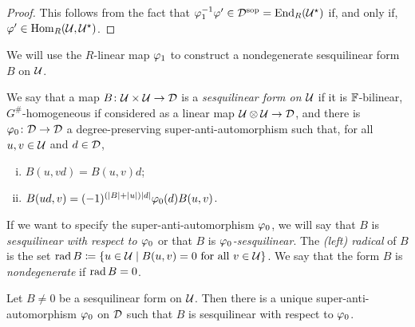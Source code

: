 \begin{proof}
    This follows from the fact that $ \varphi_1^{-1} \varphi' \in  \mathcal{D}^{\mathrm{sop}} = \operatorname{End}_R(\mathcal U^\star)$ if, and only if, $\varphi' \in \operatorname{Hom}_R(\mathcal U, \mathcal U^\star)$.
\end{proof}


We will use 
the $R$-linear map 
$\varphi_1$ to construct a nondegenerate sesquilinear form $B$ on $\mathcal U$. 

\begin{defi}\label{def:sesquilinear-form}
    We say that a map $B\colon \mathcal U \times \mathcal U \to \mathcal{D}$ is a \emph{sesquilinear form on $\mathcal U$} if it is $\mathbb{F}$-bilinear, $G^\#$-homogeneous if considered as a linear map $\mathcal U\otimes \mathcal U \to \mathcal{D}$, and there is $\varphi_0\colon \mathcal{D} \to \mathcal{D}$ a degree-preserving su\-per\--an\-ti\--auto\-mor\-phism such that, for all $u,v \in \mathcal U$ and $d\in \mathcal{D}$,
    \begin{enumerate}[(i)]
        \item $B(u,vd) = B(u,v)d$; \label{enum:linear-on-the-second}
        \item $B(ud, v) = (-1)^ {(|B| + |u|)|d|}\varphi_0(d) B(u, v)$. \label{enum:vphi0-linear-on-the-first}
    \end{enumerate}
    If we want to specify the super-anti-automorphism $\varphi_0$, we will say that $B$ is \emph{sesquilinear with respect to $\varphi_0$} or that $B$ is \emph{$\varphi_0$-sesquilinear}. 
    The \emph{(left) radical} of $B$ is the set $\operatorname{rad} B \coloneqq \{u\in \mathcal U \mid B(u, v) = 0 \text{ for all } v\in \mathcal U\}$. We say that the form $B$ is \emph{nondegenerate} if $\operatorname{rad} B = 0$.
\end{defi}


\begin{lemma}\label{lemma:B-determines-vphi_0}
    Let $B \neq 0$ be a sesquilinear form on $\mathcal U$. 
    Then there is a unique super-anti-automorphism $\varphi_0$ on $\mathcal{D}$ such that $B$ is sesquilinear with respect to $\varphi_0$.
\end{lemma}

